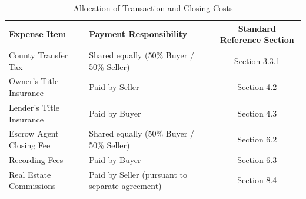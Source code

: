 \begin{table}[H]
\centering
\caption{Allocation of Transaction and Closing Costs}
\label{tab:escrow_costs}
\begin{tabularx}{\textwidth}{l X c}
\toprule
\textbf{Expense Item} & \textbf{Payment Responsibility} & \textbf{Standard Reference Section} \\
\midrule
County Transfer Tax & Shared equally (50\% Buyer / 50\% Seller) & Section 3.3.1 \\
Owner's Title Insurance & Paid by Seller & Section 4.2 \\
Lender's Title Insurance & Paid by Buyer & Section 4.3 \\
Escrow Agent Closing Fee & Shared equally (50\% Buyer / 50\% Seller) & Section 6.2 \\
Recording Fees & Paid by Buyer & Section 6.3 \\
Real Estate Commissions & Paid by Seller (pursuant to separate agreement) & Section 8.4 \\
\bottomrule
\end{tabularx}
\end{table}

